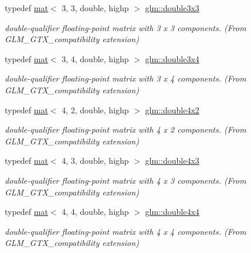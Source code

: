 \begin{DoxyCompactItemize}
typedef \hyperlink{structglm_1_1mat}{mat}$<$ 3, 3, double, highp $>$ \hyperlink{group__gtx__compatibility_ga7cf33790969e0985a53ff01d914bf8ef}{glm\+::double3x3}
\begin{DoxyCompactList}\small\item\em double-\/qualifier floating-\/point matrix with 3 x 3 components. (From G\+L\+M\+\_\+\+G\+T\+X\+\_\+compatibility extension) \end{DoxyCompactList}\item 
\mbox{\label{group__gtx__compatibility_gad93d79598c615c80626e270f4357d189}} 
typedef \hyperlink{structglm_1_1mat}{mat}$<$ 3, 4, double, highp $>$ \hyperlink{group__gtx__compatibility_gad93d79598c615c80626e270f4357d189}{glm\+::double3x4}
\begin{DoxyCompactList}\small\item\em double-\/qualifier floating-\/point matrix with 3 x 4 components. (From G\+L\+M\+\_\+\+G\+T\+X\+\_\+compatibility extension) \end{DoxyCompactList}\item 
\mbox{\label{group__gtx__compatibility_ga5ca0eb6627cf8829e3cab6694d1a6452}} 
typedef \hyperlink{structglm_1_1mat}{mat}$<$ 4, 2, double, highp $>$ \hyperlink{group__gtx__compatibility_ga5ca0eb6627cf8829e3cab6694d1a6452}{glm\+::double4x2}
\begin{DoxyCompactList}\small\item\em double-\/qualifier floating-\/point matrix with 4 x 2 components. (From G\+L\+M\+\_\+\+G\+T\+X\+\_\+compatibility extension) \end{DoxyCompactList}\item 
\mbox{\label{group__gtx__compatibility_ga2f73c8a3c9cd5198695163229f0ce754}} 
typedef \hyperlink{structglm_1_1mat}{mat}$<$ 4, 3, double, highp $>$ \hyperlink{group__gtx__compatibility_ga2f73c8a3c9cd5198695163229f0ce754}{glm\+::double4x3}
\begin{DoxyCompactList}\small\item\em double-\/qualifier floating-\/point matrix with 4 x 3 components. (From G\+L\+M\+\_\+\+G\+T\+X\+\_\+compatibility extension) \end{DoxyCompactList}\item 
\mbox{\label{group__gtx__compatibility_gaa0d75f4adb5cb1af3b1ba09720954306}} 
typedef \hyperlink{structglm_1_1mat}{mat}$<$ 4, 4, double, highp $>$ \hyperlink{group__gtx__compatibility_gaa0d75f4adb5cb1af3b1ba09720954306}{glm\+::double4x4}
\begin{DoxyCompactList}\small\item\em double-\/qualifier floating-\/point matrix with 4 x 4 components. (From G\+L\+M\+\_\+\+G\+T\+X\+\_\+compatibility extension) \end{DoxyCompactList}\end{DoxyCompactItemize}
